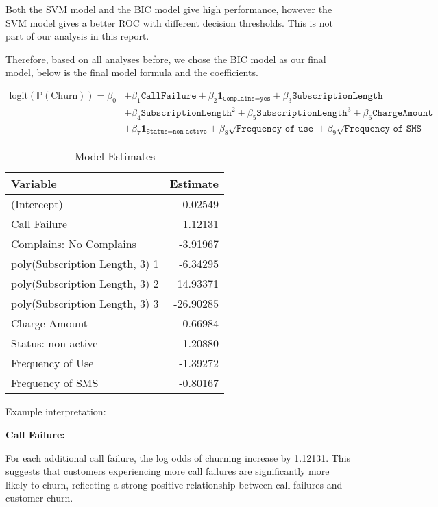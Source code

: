 \documentclass[11pt]{article}
\begin{document}
Both the SVM model and the BIC model give high performance, however the SVM model gives a better ROC with different decision thresholds. This is not part of our analysis in this report. 

Therefore, based on all analyses before, we chose the BIC model as our final model, below is the final model formula and the coefficients. 

$$
\begin{aligned}
\text{logit}(\mathbb{P}(\text{Churn})) = \beta_0 
&+ \beta_1 {\texttt{CallFailure}} 
+ \beta_2 \mathbf{1}_{\texttt{Complains=yes}} 
+ \beta_3 {\texttt{SubscriptionLength}}\\
&
+ \beta_4 {\texttt{SubscriptionLength}^2}
+ \beta_5 {\texttt{SubscriptionLength}^3} 
+ \beta_6 {\texttt{ChargeAmount}} \\
& + \beta_7 \mathbf{1}_{\texttt{Status=non-active}} 
+ \beta_8 \sqrt{\texttt{Frequency of use}}
+ \beta_9 \sqrt{\texttt{Frequency of SMS}}
\end{aligned}
$$

\begin{table}[h]
\centering
\caption{Model Estimates}
\begin{tabular}{lr}
\toprule
\textbf{Variable} & \textbf{Estimate} \\
\midrule
(Intercept) & 0.02549 \\
Call Failure & 1.12131 \\
Complains: No Complains & -3.91967 \\
poly(Subscription Length, 3) 1 & -6.34295 \\
poly(Subscription Length, 3) 2 & 14.93371 \\
poly(Subscription Length, 3) 3 & -26.90285 \\
Charge Amount & -0.66984 \\
Status: non-active & 1.20880 \\
Frequency of Use & -1.39272 \\
Frequency of SMS & -0.80167 \\
\bottomrule
\end{tabular}
\end{table}

Example interpretation: 

\textbf{Call Failure: }

For each additional call failure, the log odds of churning increase by 1.12131. This suggests that customers experiencing more call failures are significantly more likely to churn, reflecting a strong positive relationship between call failures and customer churn.
\end{document}
